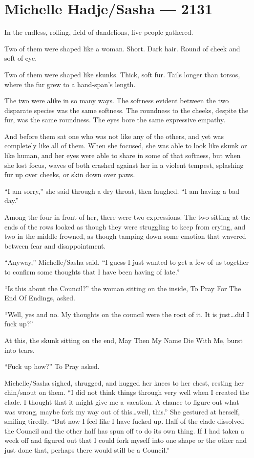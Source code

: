 \hypertarget{michelle-hadjesasha-2131}{%
\chapter{Michelle Hadje/Sasha — 2131}\label{michelle-hadjesasha-2131}}

In the endless, rolling, field of dandelions, five people gathered.

Two of them were shaped like a woman. Short. Dark hair. Round of cheek and soft of eye.

Two of them were shaped like skunks. Thick, soft fur. Tails longer than torsos, where the fur grew to a hand-span's length.

The two were alike in so many ways. The softness evident between the two disparate species was the same softness. The roundness to the cheeks, despite the fur, was the same roundness. The eyes bore the same expressive empathy.

And before them sat one who was not like any of the others, and yet was completely like all of them. When she focused, she was able to look like skunk or like human, and her eyes were able to share in some of that softness, but when she lost focus, waves of both crashed against her in a violent tempest, splashing fur up over cheeks, or skin down over paws.

``I am sorry,'' she said through a dry throat, then laughed. ``I am having a bad day.''

Among the four in front of her, there were two expressions. The two sitting at the ends of the rows looked as though they were struggling to keep from crying, and two in the middle frowned, as though tamping down some emotion that wavered between fear and disappointment.

``Anyway,'' Michelle/Sasha said. ``I guess I just wanted to get a few of us together to confirm some thoughts that I have been having of late.''

``Is this about the Council?'' the woman sitting on the inside, To Pray For The End Of Endings, asked.

``Well, yes and no. My thoughts on the council were the root of it. It is just\ldots did I fuck up?''

At this, the skunk sitting on the end, May Then My Name Die With Me, burst into tears.

``Fuck up how?'' To Pray asked.

Michelle/Sasha sighed, shrugged, and hugged her knees to her chest, resting her chin/snout on them. ``I did not think things through very well when I created the clade. I thought that it might give me a vacation. A chance to figure out what was wrong, maybe fork my way out of this\ldots well, this.'' She gestured at herself, smiling tiredly. ``But now I feel like I have fucked up. Half of the clade dissolved the Council and the other half has spun off to do its own thing. If I had taken a week off and figured out that I could fork myself into one shape or the other and just done that, perhaps there would still be a Council.''

